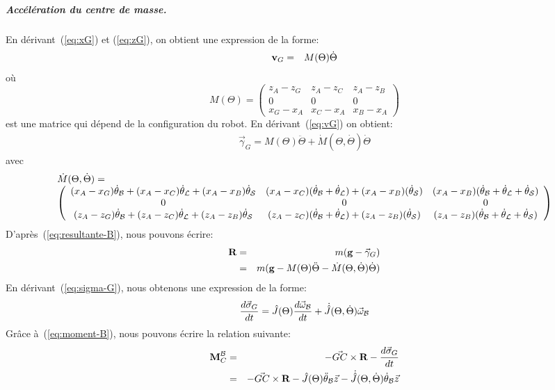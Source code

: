 \subparagraph{Accélération du centre de masse.}
En dérivant~(\ref{eq:xG}) et (\ref{eq:zG}), on obtient une expression
de la forme:
\begin{eqnarray}
\label{eq:vG}
\textbf{v}_G &=& M(\Theta) \dot{\Theta}
\end{eqnarray}
où
$$
M(\Theta) =
\left(\begin{array}{ccc}
z_A-z_G & z_A-z_C & z_A-z_B \\
0 & 0 & 0 \\
x_G-x_A & x_C-x_A & x_B-x_A
\end{array}\right)
$$
est une matrice qui dépend de la configuration du robot.
En dérivant~(\ref{eq:vG}) on obtient:
\begin{eqnarray}
\label{eq:gammaG}
\vec{\gamma}_G = M(\Theta)\ddot{\Theta} + \dot{M}(\Theta,\dot{\Theta})\dot{\Theta}
\end{eqnarray}
avec
{\tiny
$$
\begin{array}{l}
\dot{M}(\Theta,\dot{\Theta})=\\
\left(\begin{array}{ccc}
(x_A-x_G)\dot{\theta}_{\cal B}+(x_A-x_C)\dot{\theta}_{\cal
  L}+(x_A-x_B)\dot{\theta}_{\cal S} &
(x_A-x_C)(\dot{\theta}_{\cal B}+\dot{\theta}_{\cal L}) +
(x_A-x_B)(\dot{\theta}_{\cal S}) &
(x_A-x_B)(\dot{\theta}_{\cal B}+\dot{\theta}_{\cal
  L}+\dot{\theta}_{\cal S}) \\
0 & 0 & 0 \\
(z_A-z_G)\dot{\theta}_{\cal B}+(z_A-z_C)\dot{\theta}_{\cal
  L}+(z_A-z_B)\dot{\theta}_{\cal S} &
(z_A-z_C)(\dot{\theta}_{\cal B}+\dot{\theta}_{\cal L}) +
(z_A-z_B)(\dot{\theta}_{\cal S}) &
(z_A-z_B)(\dot{\theta}_{\cal B}+\dot{\theta}_{\cal
  L}+\dot{\theta}_{\cal S}) \\
\end{array}\right)
\end{array}
$$
}
D'après~(\ref{eq:resultante-B}), nous pouvons écrire:
\begin{eqnarray}\label{eq:R-1}
\textbf{R} &=& m(\textbf{g} -\vec{\gamma}_G) \\
\label{eq:R-2}
&=& m(\textbf{g} - M(\Theta)\ddot{\Theta} - \dot{M}(\Theta,\dot{\Theta})\dot{\Theta})
\end{eqnarray}
En dérivant~(\ref{eq:sigma-G}), nous obtenons une expression de la
forme:
$$
\frac{d\vec{\sigma}_G}{dt} = \hat{J}(\Theta) \frac{d\vec{\omega}_{\cal
    B}}{dt} + \dot{\hat{J}}(\Theta,\dot{\Theta})\vec{\omega}_{\cal B}
$$
Grâce à~(\ref{eq:moment-B}), nous pouvons écrire la relation
suivante:
\begin{eqnarray}\label{eq:moment-C-1}
\textbf{M}^{\cal B}_C &=& -\vec{GC}\times \textbf{R} -
\frac{d\vec{\sigma}_G}{dt} \\
\label{eq:moment-C-2}
&=& -\vec{GC}\times \textbf{R} -
\hat{J}(\Theta) \ddot{\theta}_{\cal B} \vec{z} -
\dot{\hat{J}}(\Theta,\dot{\Theta})\dot{\theta}_{\cal B} \vec{z}
\end{eqnarray}
